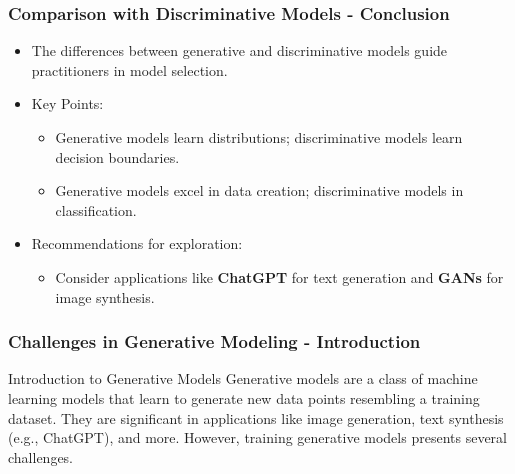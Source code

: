 \documentclass[aspectratio=169]{beamer}
\begin{document}
\begin{frame}[fragile]
    \frametitle{Comparison with Discriminative Models - Conclusion}
    \begin{itemize}
        \item The differences between generative and discriminative models guide practitioners in model selection.
        \item Key Points:
        \begin{itemize}
            \item Generative models learn distributions; discriminative models learn decision boundaries.
            \item Generative models excel in data creation; discriminative models in classification.
        \end{itemize}
        \item Recommendations for exploration:
        \begin{itemize}
            \item Consider applications like \textbf{ChatGPT} for text generation and \textbf{GANs} for image synthesis.
        \end{itemize}
    \end{itemize}
\end{frame}

\begin{frame}[fragile]
    \frametitle{Challenges in Generative Modeling - Introduction}
    \begin{block}{Introduction to Generative Models}
        Generative models are a class of machine learning models that learn to generate new data points resembling a training dataset. 
        They are significant in applications like image generation, text synthesis (e.g., ChatGPT), and more. 
        However, training generative models presents several challenges.
    \end{block}
\end{frame}
\end{document}
